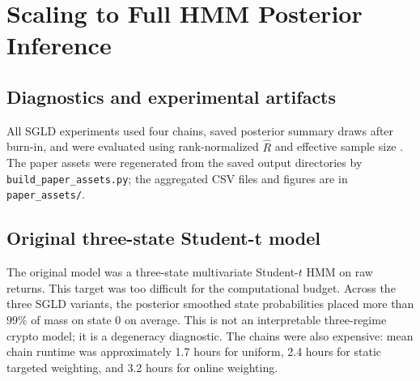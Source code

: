 \documentclass{article}
\newcommand{\1}{\mathbf{1}}
\begin{document}
\begin{table}[t]
  \centering
  \caption{Real-data HMM-style gradient-estimator benchmark. The target is stress-state emission-gradient contribution by 10-day block, constructed from the real crypto panel and Stan K=2 smoothed stress probabilities. Lower RMSE is better.}
  \label{tab:real-gradient-benchmark}
  
\end{table}

\section{Scaling to Full HMM Posterior Inference}
\label{sec:full-hmm-results}

\subsection{Diagnostics and experimental artifacts}

All SGLD experiments used four chains, saved posterior summary draws after burn-in, and were evaluated using rank-normalized $\hat R$ and effective sample size \citep{gelman1992inference,vehtari2021rhat}. The paper assets were regenerated from the saved output directories by \texttt{build\_paper\_assets.py}; the aggregated CSV files and figures are in \texttt{paper\_assets/}.

\subsection{Original three-state Student-t model}

The original model was a three-state multivariate Student-$t$ HMM on raw returns. This target was too difficult for the computational budget. Across the three SGLD variants, the posterior smoothed state probabilities placed more than $99\%$ of mass on state 0 on average. This is not an interpretable three-regime crypto model; it is a degeneracy diagnostic. The chains were also expensive: mean chain runtime was approximately 1.7 hours for uniform, 2.4 hours for static targeted weighting, and 3.2 hours for online weighting.

\begin{table}[t]
  \centering
  \caption{State occupancy summaries for the original Student-$t$ model and the rolling-standardized Gaussian comparisons. The original $K=3$ Student-$t$ model collapses into state 0. The $K=2$ Gaussian model gives healthier occupancies near a 60/40 split.}
  \label{tab:occupancy}
  \resizebox{\linewidth}{!}{}
\end{table}
\end{document}
